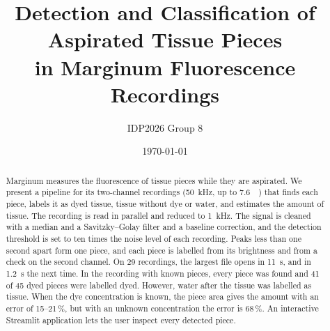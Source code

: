 \documentclass[11pt,a4paper]{article}
\title{Detection and Classification of Aspirated Tissue Pieces\\
       in Marginum Fluorescence Recordings}
\author{IDP2026 Group 8}
\date{\today}
\begin{document}
\maketitle

\begin{abstract}
Marginum measures the fluorescence of tissue pieces while they are aspirated. We present a
pipeline for its two-channel recordings (\SI{50}{\kilo\hertz}, up to \SI{7.6}{\giga\byte}) that
finds each piece, labels it as dyed tissue, tissue without dye or water, and estimates the
amount of tissue. The recording is read in parallel and reduced to \SI{1}{\kilo\hertz}. The
signal is cleaned with a median and a Savitzky--Golay filter and a baseline correction, and the
detection threshold is set to ten times the noise level of each recording. Peaks less than one
second apart form one piece, and each piece is labelled from its brightness and from a check
on the second channel. On 29 recordings, the largest file opens in \SI{11}{\second}, and in
\SI{1.2}{\second} the next time. In the recording with known pieces, every piece was found and
41 of 45 dyed pieces were labelled dyed. However, water after the tissue was labelled as
tissue. When the dye concentration is known, the piece area gives the amount with an error of
15--21\,\%, but with an unknown concentration the error is 68\,\%. An interactive Streamlit
application lets the user inspect every detected piece.
\end{abstract}

\tableofcontents











\end{document}
